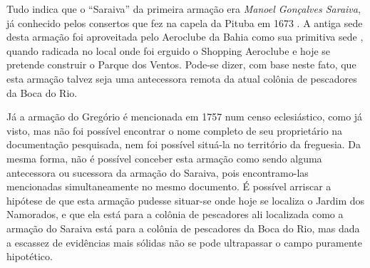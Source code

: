 Tudo indica que o ``Saraiva'' da primeira armação era \textit{Manoel Gonçalves Saraiva}, já conhecido pelos consertos que fez na capela da Pituba em 1673 \cite[p.~11]{ott_engenhos_1996}. A antiga sede desta armação foi aproveitada pelo Aeroclube da Bahia como sua primitiva sede \cite[p.~III-11, verso]{teixeira_doacoes_1978}, quando radicada no local onde foi erguido o Shopping Aeroclube e hoje se pretende construir o Parque dos Ventos. Pode-se dizer, com base neste fato, que esta armação talvez seja uma antecessora remota da atual colônia de pescadores da Boca do Rio.

Já a armação do Gregório é mencionada em 1757 num censo eclesiástico, como já visto, mas não foi possível encontrar o nome completo de seu proprietário na documentação pesquisada, nem foi possível situá-la no território da freguesia. Da mesma forma, não é possível conceber esta armação como sendo alguma antecessora ou sucessora da armação do Saraiva, pois encontramo-las mencionadas simultaneamente no mesmo documento. É possível arriscar a hipótese de que esta armação pudesse situar-se onde hoje se localiza o Jardim dos Namorados, e que ela está para a colônia de pescadores ali localizada como a armação do Saraiva está para a colônia de pescadores da Boca do Rio, mas dada a escassez de evidências mais sólidas não se pode ultrapassar o campo puramente hipotético.